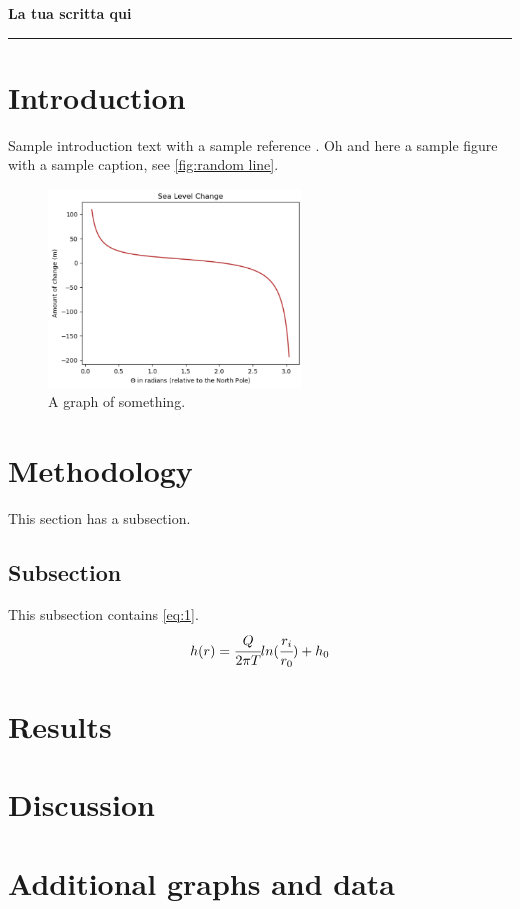 \documentclass{article}
\begin{document}


\tableofcontents
\newpage

\begin{center}
    \textbf{La tua scritta qui} \\[0.5]
    \rule{1.2\textwidth}{0.4pt}
\end{center}

\section*{Introduction}
Sample introduction text with a sample reference \cite{HussFarinotti2014}. Oh and here a sample figure with a sample caption, see \autoref{fig:random line}.

\begin{figure}[H]
\centering
\includegraphics[width=0.6\textwidth]{images/Sample graph.png}
\caption{A graph of something.}
\label{fig:random line}
\end{figure}

\section{Methodology}
This section has a subsection.
\subsection{Subsection}
This subsection contains \autoref{eq:1}.
\begin{equation}
\label{eq:1}
    h(r) = \cfrac{Q}{2\pi T} ln(\cfrac{r_i}{r_0})+h_0
\end{equation}

\section{Results}

\section{Discussion}


\newpage
{}



\newpage
\appendix
\section{Additional graphs and data}
\end{document}
